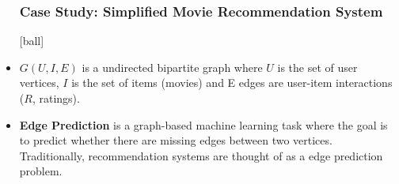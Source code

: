\documentclass{beamer}
\begin{document}
\begin{frame}[fragile]
\begin{itemize}
\frametitle{Case Study: Simplified Movie Recommendation System}
[ball]

\item $G(U,I,E)$ is a undirected bipartite graph where $U$ is the set of user vertices, $I$ is the set of items (movies) and E edges are user-item interactions ($R$, ratings).

\vspace{0.8cm}
\hspace{-0.5cm}
\begin{minipage}[c]{0.8\textwidth}
    \hspace{0.8cm}
    
\end{minipage}

\end{itemize}
\end{frame}


\begin{frame}[fragile]
\begin{itemize}
\frametitle{Edge Prediction}
[ball]

\item \textbf{Edge Prediction} is a graph-based machine learning task where the goal is to predict whether there are missing edges between two vertices. Traditionally, recommendation systems are thought of as a edge prediction problem.

\vspace{0.5cm}
\hspace{-0.5cm}
\begin{minipage}[c]{0.8\textwidth}
    \hspace{0.8cm}
    
\end{minipage}

\end{itemize}
\end{frame}

\end{document}
